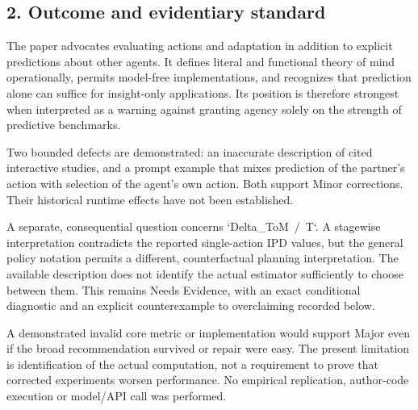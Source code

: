 \documentclass[10pt]{article}
\begin{document}
\subsection*{2. Outcome and evidentiary standard}
The paper advocates evaluating actions and adaptation in addition to explicit predictions about other agents. It defines literal and functional theory of mind operationally, permits model-free implementations, and recognizes that prediction alone can suffice for insight-only applications. Its position is therefore strongest when interpreted as a warning against granting agency solely on the strength of predictive benchmarks.\par
Two bounded defects are demonstrated: an inaccurate description of cited interactive studies, and a prompt example that mixes prediction of the partner’s action with selection of the agent’s own action. Both support Minor corrections. Their historical runtime effects have not been established.\par
A separate, consequential question concerns `Delta\_ToM / T`. A stagewise interpretation contradicts the reported single-action IPD values, but the general policy notation permits a different, counterfactual planning interpretation. The available description does not identify the actual estimator sufficiently to choose between them. This remains Needs Evidence, with an exact conditional diagnostic and an explicit counterexample to overclaiming recorded below.\par
A demonstrated invalid core metric or implementation would support Major even if the broad recommendation survived or repair were easy. The present limitation is identification of the actual computation, not a requirement to prove that corrected experiments worsen performance. No empirical replication, author-code execution or model/API call was performed.\par
\end{document}
